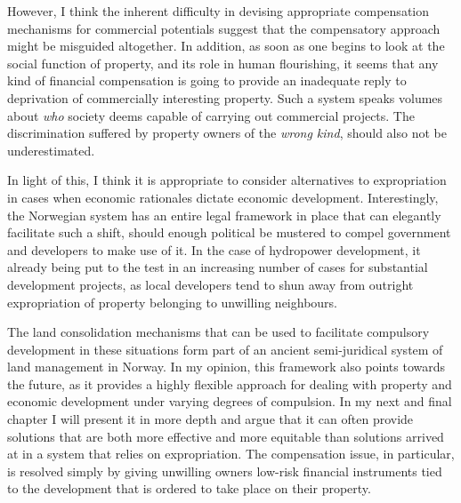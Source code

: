 However, I think the inherent difficulty in devising appropriate compensation mechanisms for commercial potentials suggest that the compensatory approach might be misguided altogether. In addition, as soon as one begins to look at the social function of property, and its role in human flourishing, it seems that any kind of financial compensation is going to provide an inadequate reply to deprivation of commercially interesting property. Such a system speaks volumes about {\it who} society deems capable of carrying out commercial projects. The discrimination suffered by property owners of the {\it wrong kind}, should also not be underestimated. 

In light of this, I think it is appropriate to consider alternatives to expropriation in cases when economic rationales dictate economic development. Interestingly, the Norwegian system has an entire legal framework in place that can elegantly facilitate such a shift, should enough political be mustered to compel government and developers to make use of it. In the case of hydropower development, it already being put to the test in an increasing number of cases for substantial development projects, as local developers tend to shun away from outright expropriation of property belonging to unwilling neighbours. 

The land consolidation mechanisms that can be used to facilitate compulsory development in these situations form part of an ancient semi-juridical system of land management in Norway. In my opinion, this framework also points towards the future, as it provides a highly flexible approach for dealing with property and economic development under varying degrees of compulsion. In my next and final chapter I will present it in more depth and argue that it can often provide solutions that are both more effective and more equitable than solutions arrived at in a system that relies on expropriation. The compensation issue, in particular, is resolved simply by giving unwilling owners low-risk financial instruments tied to the development that is ordered to take place on their property.

